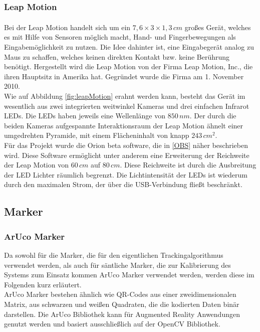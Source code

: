 \subsubsection{Leap Motion} 	
Bei der Leap Motion\textsuperscript{\cite{website:LeapMotion}} handelt sich um ein $7,6\times3\times1,3\,cm$ großes Gerät, welches es mit Hilfe von Sensoren möglich macht, Hand- und Fingerbewegungen als Eingabemöglichkeit zu nutzen. Die Idee dahinter ist, eine Eingabegerät analog zu Maus zu schaffen, welches keinen direkten Kontakt bzw. keine Berührung benötigt. Hergestellt wird die Leap Motion von der Firma Leap Motion, Inc., die ihren Hauptsitz in Amerika hat. Gegründet wurde die Firma am 1. November 2010. \\
Wie auf Abbildung \ref{fig:leapMotion} erahnt werden kann, besteht das Gerät im wesentlich aus zwei integrierten weitwinkel Kameras und drei einfachen Infrarot LEDs. Die LEDs haben jeweils eine Wellenlänge von $850\,nm$. Der durch die beiden Kameras aufgespannte Interaktionsraum der Leap Motion ähnelt einer umgedrehten Pyramide, mit einem Flächeninhalt von knapp $243\,cm{^2}$. \\
Für das Projekt wurde die Orion beta software, die in \ref{OBS} näher beschrieben wird. Diese Software ermöglicht unter anderem eine Erweiterung der Reichweite der Leap Motion von $60\,cm$ auf $80\,cm$. Diese Reichweite ist durch die Ausbreitung der LED Lichter räumlich begrenzt. Die Lichtintensität der LEDs ist wiederum durch den maximalen Strom, der über die USB-Verbindung fließt beschränkt. \\

\subsection{Marker}
\subsubsection{ArUco Marker}
Da sowohl für die Marker, die für den eigentlichen Trackingalgorithmus verwendet werden, als auch für säntliche Marker, die zur Kalibrierung des Systems zum Einsatz kommen ArUco Marker verwendet werden, werden diese im Folgenden kurz erläutert.\\
ArUco Marker bestehen ähnlich wie QR-Codes aus einer zweidimensionalen Matrix, aus schwarzen und weißen Quadraten, die die kodierten Daten binär darstellen. Die ArUco Bibliothek kann für Augmented Reality Anwendungen genutzt werden und basiert ausschließlich auf der OpenCV Bibliothek. 
 
